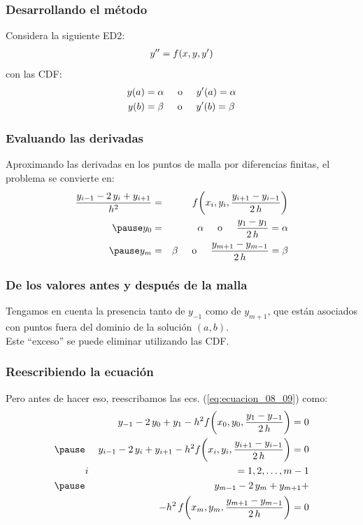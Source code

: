 \documentclass[12pt]{beamer}
\begin{document}
\begin{frame}
\frametitle{Desarrollando el método}
Considera la siguiente ED2:
\pause
\begin{align*}
{y}^{\prime \prime} = f (x, y, {y}^{\prime})
\end{align*}
\pause
con las CDF:
\begin{align*}
y (a) &= \alpha \hspace{0.5cm} \text{o} \hspace{0.5cm} {y}^{\prime} (a) = \alpha \\
y (b) &= \beta \hspace{0.5cm} \text{o} \hspace{0.5cm} {y}^{\prime} (b) = \beta
\end{align*}
\end{frame}
\begin{frame}
\frametitle{Evaluando las derivadas}
Aproximando las derivadas en los puntos de malla por diferencias finitas, el problema se convierte en:
\pause
\begin{eqnarray}
\dfrac{y_{i-1} - 2 \, y_{i} +  y_{i+1}}{h^{2}} &=& f \bigg( x_{i}, y_{i}, \dfrac{y_{i+1} - y_{i-1}}{2 \, h} \bigg) \label{eq:ecuacion_08_09} \\ \pause
y_{0} &=& \alpha \hspace{0.5cm} \text{o} \hspace{0.5cm} \dfrac{y_{1} - y_{1}}{2 \, h} = \alpha \label{eq:ecuacion_08_10a} \\ \pause
y_{m} &=& \beta \hspace{0.5cm} \text{o} \hspace{0.5cm} \dfrac{y_{m+1} - y_{m-1}}{2 \, h} = \beta \label{eq:ecuacion_08_10b}
\end{eqnarray}
\end{frame}
\begin{frame}
\frametitle{De los valores antes y después de la malla}
Tengamos en cuenta la presencia tanto de $y_{-1}$ como de $y_{m+1}$, \pause que están asociados con puntos fuera del dominio de la solución $(a,b)$.
\\
\bigskip
\pause
Este \enquote{exceso} se puede eliminar utilizando las CDF.
\end{frame}
\begin{frame}
\frametitle{Reescribiendo la ecuación}
Pero antes de hacer eso, reescribamos las ecs. (\ref{eq:ecuacion_08_09}) como:
\pause
\begin{eqnarray}
&{}& y_{-1} - 2 \, y_{0} + y_{1} - h^{2}  f \bigg( x_{0}, y_{0}, \dfrac{y_{1} - y_{-1}}{2 \, h} \bigg) = 0 \label{eq:ecuacion_a} \\ \pause
&{}&y_{i-1} - 2 \, y_{i} + y_{i+1} - h^{2}  f \bigg( x_{i}, y_{i}, \dfrac{y_{i+1} - y_{i-1}}{2 \, h} \bigg) = 0 \\
&i& = 1, 2, \ldots, m-1 \label{eq:ecuacion_b} \\ \pause
&{}& y_{m-1} - 2 \, y_{m} + y_{m+1} + \nonumber \\
&{}& - h^{2} \, f \bigg( x_{m}, y_{m}, \dfrac{y_{m+1} - y_{m-1}}{2 \, h} \bigg) = 0 \label{eq:ecuacion_c}
\end{eqnarray}
\end{frame}
\end{document}
